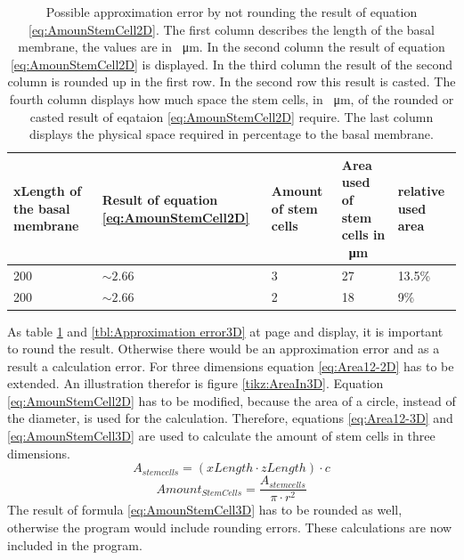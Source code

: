 \begin{table}[ht]
\centering
\caption[Approximation errors of a not rounded result, with which it is further calculated]{Possible approximation error by not rounding the result of equation \ref{eq:AmounStemCell2D}. The first column describes the length of the basal membrane, the values are  in \SI{}{\micro\metre}. In the second column the result of equation \ref{eq:AmounStemCell2D} is displayed. In the third column the result of the second column is rounded up in the first row. In the second row this result is casted. The fourth column displays how much space the stem cells, in \SI{}{\micro\metre}, of the rounded or casted result of eqataion \ref{eq:AmounStemCell2D} require. The last column displays the physical space required in percentage to the basal membrane. \newline}
\renewcommand{\arraystretch}{1.5}
	\begin{tabularx}{\textwidth}{|X|X|X|X|X|}
	\hline
		xLength of the basal membrane & Result of equation \ref{eq:AmounStemCell2D} & Amount of stem cells & Area used of stem cells  in \SI{}{\micro\metre} & relative used area  \\
		\hline
	\hline
		
		200 & $\sim 2.66$ & 3 & 27 & 13.5\% \\
		\hline
		200 & $\sim 2.66$ & 2 & 18 & 9\% 
\tabularnewline
\hline 
	\end{tabularx}
	\label{tbl:Approximation error2D}
\end{table}

As table \ref{tbl:Approximation error2D} and \ref{tbl:Approximation error3D} at page \pageref{eq:AmounStemCell2D} and \pageref{tbl:Approximation error3D} display, it is important to round the result. Otherwise there would be an approximation error and as a result a calculation error. \newline
For three dimensions equation \ref{eq:Area12-2D} has to be extended. An illustration therefor is figure \ref{tikz:AreaIn3D}. Equation \ref{eq:AmounStemCell2D} has to be modified, because the area of a circle, instead of the diameter, is used for the calculation. Therefore, equations \ref{eq:Area12-3D} and \ref{eq:AmounStemCell3D} are used to calculate the amount of stem cells in three dimensions.
\begin{equation}\label{eq:Area12-3D}
A_{stem cells} = (xLength \cdot zLength) \cdot c
\end{equation}
\begin{equation}\label{eq:AmounStemCell3D}
Amount_{StemCells} = \dfrac{A_{stem cells}}{\pi \cdot r^{2}} 
\end{equation}
The result of formula \ref{eq:AmounStemCell3D} has to be rounded as well, otherwise the program would include rounding errors. 
These calculations are now included in the program.


